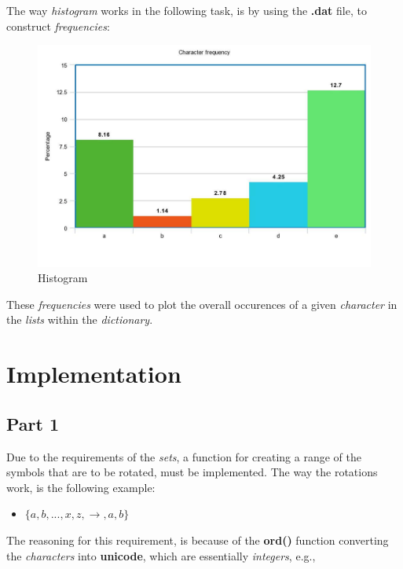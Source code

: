 \documentclass[a4paper,10pt]{article}
\begin{document}
The way \textit{histogram} works in the following task, is by using the \textbf{.dat} file, to construct \textit{frequencies}\cite{1}:

\begin{figure}[htp]
\centerline{\includegraphics[width=15cm]{meta-chart.jpeg}}
\caption{Histogram}
\label{fig:meta-chart.jpeg}
\end{figure}

These \textit{frequencies} were used to plot the overall occurences of a given \textit{character} in the \textit{lists} within the \textit{dictionary}.

\section{Implementation}

\subsection{Part 1}

Due to the requirements of the \textit{sets}, a function for creating a range of the symbols that are to be rotated, must be implemented. The way the rotations work, is the following example:

\begin{itemize}
    \item $\{a, b, ... , x, z,\rightarrow , a, b\}$
\end{itemize}

The reasoning for this requirement, is because of the \textbf{ord()} function converting the  \textit{characters} into \textbf{unicode}, which are essentially \textit{integers}, e.g.,
\end{document}
